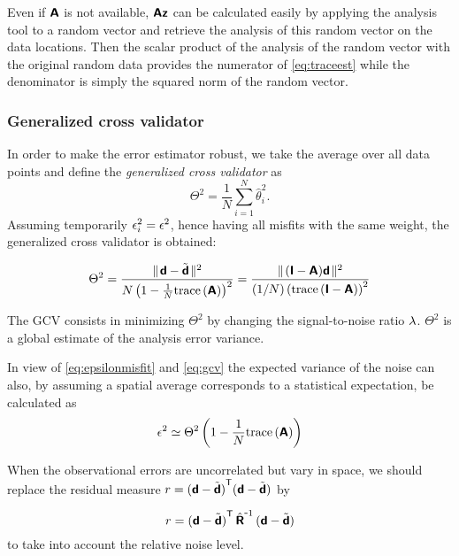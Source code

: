 Even if $\mbox{\boldmath $ \protect\mathsf{A} $}$ is not available, $\mbox{\boldmath $ \protect\mathsf{A} $} \mbox{\boldmath $ \protect\mathsf{z} $}$ can be calculated easily by applying the analysis tool to a random vector and retrieve the analysis of this random vector on the data locations. Then the scalar product of the analysis of the random vector with the original random data provides the numerator of \eqref{eq:traceest} while the denominator is simply the squared norm of the random vector.

\subsubsection{Generalized cross validator}

In order to make the error estimator robust, we take the average over all data points and define the \textit{generalized cross validator} as 
\[
\Theta^{2}=\frac{1}{N}\sum_{i=1}^{N}\hat{\theta}_i^2.
\] 
Assuming temporarily $\epsilon_{i}^{2} = \epsilon^{2}$, hence having all misfits with the same weight, the generalized cross validator is obtained:

\begin{equation}
\Theta^2=\frac{\parallel \! \mbox{\boldmath $ \protect\mathsf{d} $}-\tilde{\mbox{\boldmath $ \protect\mathsf{d} $}} \! \parallel^2}{N \left(1- \frac{1}{N}\mathrm{trace}\left( \mbox{\boldmath $ \protect\mathsf{A} $} \right)\right)^2} 
        =\frac{\parallel \! (\mbox{\boldmath $ \protect\mathsf{I} $}-\mbox{\boldmath $ \protect\mathsf{A} $})\mbox{\boldmath $ \protect\mathsf{d} $} \! \parallel^2}{(1/N)\left(\mathrm{trace}\left( \mbox{\boldmath $ \protect\mathsf{I} $}-\mbox{\boldmath $ \protect\mathsf{A} $} \right)\right)^2}
\label{eq:gcv}
\end{equation}

The GCV consists in minimizing $\Theta^{2}$ by changing the signal-to-noise ratio $\lambda$. $\Theta^2$ is a global estimate of the analysis error variance.

In view of \eqref{eq:epsilonmisfit} and \eqref{eq:gcv} the expected variance of the noise can also, by assuming a spatial average corresponds to a statistical expectation, be calculated as 
\begin{equation}
\epsilon^2 \simeq 
{\Theta^2  \left(1 - \frac{1}{N}\mathrm{trace}\left(  \mbox{\boldmath $ \protect\mathsf{A} $}  \right)\right) }
\label{eq:noiseestimate}
\end{equation}


When the observational errors are uncorrelated but vary in space, we should replace the residual measure $r = {(\mbox{\boldmath $ \protect\mathsf{d} $}-\tilde{\mbox{\boldmath $ \protect\mathsf{d} $}})}^\mathsf{T} (\mbox{\boldmath $ \protect\mathsf{d} $}-\tilde{\mbox{\boldmath $ \protect\mathsf{d} $}}) $ by 

\begin{equation}
r = {(\mbox{\boldmath $ \protect\mathsf{d} $}-\tilde{\mbox{\boldmath $ \protect\mathsf{d} $}})}^\mathsf{T} \,{ \hat{\mbox{\boldmath $ \protect\mathsf{R} $}}}^{ \mbox{\small{-}} 1} \,(\mbox{\boldmath $ \protect\mathsf{d} $}-\tilde{\mbox{\boldmath $ \protect\mathsf{d} $}})
\end{equation}
to take into account the relative noise level.

